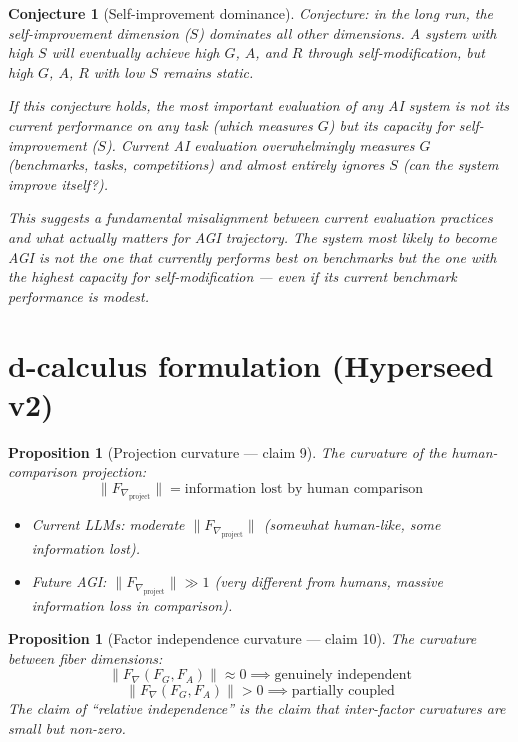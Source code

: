 \documentclass[11pt,a4paper]{article}
\newtheorem{proposition}[definition]{Proposition}
\newtheorem{conjecture}[definition]{Conjecture}
\begin{document}
\begin{conjecture}[Self-improvement dominance]
Conjecture: in the long run, the self-improvement dimension ($S$)
dominates all other dimensions. A system with high $S$ will eventually
achieve high $G$, $A$, and $R$ through self-modification, but high
$G$, $A$, $R$ with low $S$ remains static.

If this conjecture holds, the most important evaluation of any AI
system is not its current performance on any task (which measures $G$)
but its capacity for self-improvement ($S$). Current AI evaluation
overwhelmingly measures $G$ (benchmarks, tasks, competitions) and
almost entirely ignores $S$ (can the system improve itself?).

This suggests a fundamental misalignment between current evaluation
practices and what actually matters for AGI trajectory. The system
most likely to become AGI is not the one that currently performs best
on benchmarks but the one with the highest capacity for
self-modification --- even if its current benchmark performance is
modest.
\end{conjecture}

\section{d-calculus formulation (Hyperseed v2)}

\begin{proposition}[Projection curvature --- claim 9]
\label{prop:proj_curv}
The curvature of the human-comparison projection:
\[
  \|F_{\nabla_{\text{project}}}\| = \text{information lost by human comparison}
\]
\begin{itemize}
  \item Current LLMs: moderate $\|F_{\nabla_{\text{project}}}\|$
    (somewhat human-like, some information lost).
  \item Future AGI: $\|F_{\nabla_{\text{project}}}\| \gg 1$
    (very different from humans, massive information loss in comparison).
\end{itemize}
\end{proposition}

\begin{proposition}[Factor independence curvature --- claim 10]
\label{prop:factor}
The curvature between fiber dimensions:
\[
  \|F_\nabla(F_G, F_A)\| \approx 0 \implies \text{genuinely independent}
\]
\[
  \|F_\nabla(F_G, F_A)\| > 0 \implies \text{partially coupled}
\]
The claim of ``relative independence'' is the claim that inter-factor
curvatures are small but non-zero.
\end{proposition}
\end{document}
